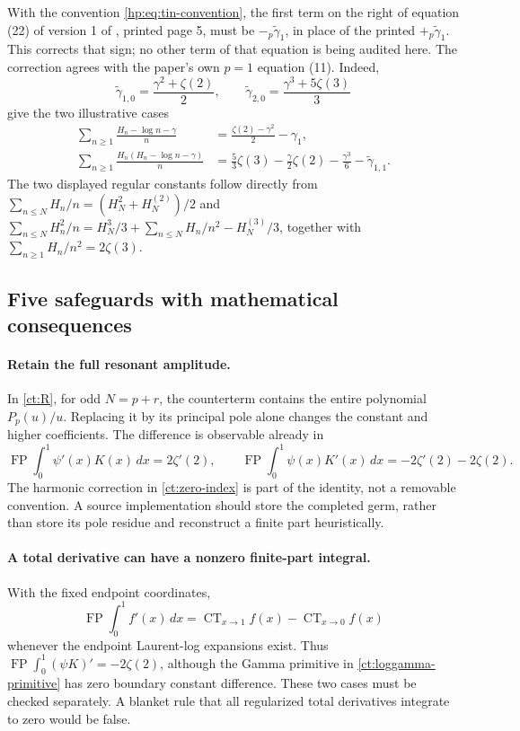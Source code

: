 \documentclass[11pt,a4paper]{article}
\numberwithin{equation}{section}
\theoremstyle{definition}
\theoremstyle{remark}
\newcommand{\FP}{\operatorname{FP}}
\newcommand{\CT}{\operatorname{CT}}
\begin{document}
With the convention \eqref{hp:eq:tin-convention}, the first term on
the right of equation (22) of version 1 of \cite{hp:Tin2025},
printed page 5, must be
$-{}_p\widetilde\gamma_1$, in place of the printed
$+{}_p\widetilde\gamma_1$. This corrects that sign; no other term
of that equation is being audited here. The correction agrees with
the paper's own $p=1$ equation (11). Indeed,
\[
 \widetilde\gamma_{1,0}=\frac{\gamma^2+\zeta(2)}2,
 \qquad
 \widetilde\gamma_{2,0}=\frac{\gamma^3+5\zeta(3)}3
\]
give the two illustrative cases
\begin{align}
 \sum_{n\ge1}\frac{H_n-\log n-\gamma}{n}
   &=\frac{\zeta(2)-\gamma^2}{2}-\gamma_1,
       \label{hp:eq:tin-pzero}\\
 \sum_{n\ge1}\frac{H_n(H_n-\log n-\gamma)}{n}
   &=\frac53\zeta(3)-\frac\gamma2\zeta(2)
       -\frac{\gamma^3}{6}-\widetilde\gamma_{1,1}.
       \label{hp:eq:tin-pone}
\end{align}
The two displayed regular constants follow directly from
$\sum_{n\le N}H_n/n=(H_N^2+H_N^{(2)})/2$ and
$\sum_{n\le N}H_n^2/n=H_N^3/3+
\sum_{n\le N}H_n/n^2-H_N^{(3)}/3$, together with
$\sum_{n\ge1}H_n/n^2=2\zeta(3)$.



\subsection{Five safeguards with mathematical consequences}

\paragraph{Retain the full resonant amplitude.}
In \eqref{ct:R}, for odd $N=p+r$, the counterterm contains the entire
polynomial $P_p(u)/u$. Replacing it by its principal pole alone changes
the constant and higher coefficients. The difference is observable
already in
\[
 \FP\int_0^1\psi'(x)K(x)\,dx=2\zeta'(2),\qquad
 \FP\int_0^1\psi(x)K'(x)\,dx=-2\zeta'(2)-2\zeta(2).
\]
The harmonic correction in \eqref{ct:zero-index} is part of the identity,
not a removable convention. A source implementation should store the
completed germ, rather than store its pole residue and reconstruct a
finite part heuristically.

\paragraph{A total derivative can have a nonzero finite-part integral.}
With the fixed endpoint coordinates,
\[
 \FP\int_0^1 f'(x)\,dx=\CT_{x\to1}f(x)-\CT_{x\to0}f(x)
\]
whenever the endpoint Laurent-log expansions exist. Thus
$\FP\int_0^1(\psi K)'=-2\zeta(2)$, although the Gamma primitive
in \eqref{ct:loggamma-primitive} has zero boundary constant difference.
These two cases must be checked separately. A blanket rule that all
regularized total derivatives integrate to zero would be false.
\end{document}
